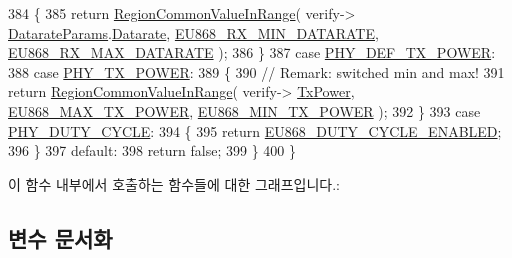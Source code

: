 \begin{DoxyCode}
384         \{
385             \textcolor{keywordflow}{return} \mbox{\hyperlink{group___r_e_g_i_o_n_c_o_m_m_o_n_gafdd1c80d953e18d755a631b72a9c3bd3}{RegionCommonValueInRange}}( verify->
      \mbox{\hyperlink{unionu_verify_params_a92427be16343eb3d9c14334eb95ec058}{DatarateParams}}.\mbox{\hyperlink{structu_verify_params_1_1s_datarate_params_ae2f6080f3aa0e9485c55513ca56bb24d}{Datarate}}, \mbox{\hyperlink{group___r_e_g_i_o_n_e_u868_gaa1bdf9b64650b847961424f9098278fc}{EU868\_RX\_MIN\_DATARATE}}, 
      \mbox{\hyperlink{group___r_e_g_i_o_n_e_u868_ga84a09a53f67ea79b84d27a56e51679ab}{EU868\_RX\_MAX\_DATARATE}} );
386         \}
387         \textcolor{keywordflow}{case} \mbox{\hyperlink{group___r_e_g_i_o_n_gga51cbe8f5433d914fe9cf81b451de2c2da18ae0d314f20c212f9e40207099ab1bb}{PHY\_DEF\_TX\_POWER}}:
388         \textcolor{keywordflow}{case} \mbox{\hyperlink{group___r_e_g_i_o_n_gga51cbe8f5433d914fe9cf81b451de2c2da0dceb30b79f1bae301afd5406a86d6f3}{PHY\_TX\_POWER}}:
389         \{
390             \textcolor{comment}{// Remark: switched min and max!}
391             \textcolor{keywordflow}{return} \mbox{\hyperlink{group___r_e_g_i_o_n_c_o_m_m_o_n_gafdd1c80d953e18d755a631b72a9c3bd3}{RegionCommonValueInRange}}( verify->
      \mbox{\hyperlink{unionu_verify_params_a037b4f849fa8ed4aa1d3c58aef2b28ec}{TxPower}}, \mbox{\hyperlink{group___r_e_g_i_o_n_e_u868_ga39e338c7f8454f594302811f61d9560d}{EU868\_MAX\_TX\_POWER}}, \mbox{\hyperlink{group___r_e_g_i_o_n_e_u868_gab935a0225d447579203239740e33c72f}{EU868\_MIN\_TX\_POWER}} );
392         \}
393         \textcolor{keywordflow}{case} \mbox{\hyperlink{group___r_e_g_i_o_n_gga51cbe8f5433d914fe9cf81b451de2c2dac66308571e624ecc28c79ee0deab8cf0}{PHY\_DUTY\_CYCLE}}:
394         \{
395             \textcolor{keywordflow}{return} \mbox{\hyperlink{group___r_e_g_i_o_n_e_u868_gaa8c53df1d013b427281bafe2ed9cbcce}{EU868\_DUTY\_CYCLE\_ENABLED}};
396         \}
397         \textcolor{keywordflow}{default}:
398             \textcolor{keywordflow}{return} \textcolor{keyword}{false};
399     \}
400 \}
\end{DoxyCode}
이 함수 내부에서 호출하는 함수들에 대한 그래프입니다.\+:


\subsection{변수 문서화}
\mbox{\label{group___r_e_g_i_o_n_e_u868_gaa5abb02aef836d84ef991986d9b1d9e1}} 
